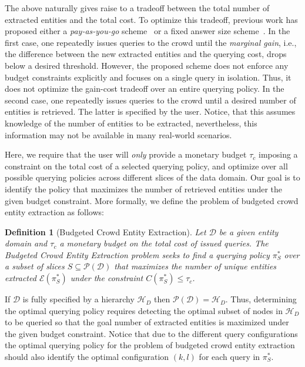 \documentclass{vldb}
\newtheorem{definition}{Definition}
\newcommand{\domain}{\mathcal{D}}
\newcommand{\hierarchy}{\mathcal{H}_D}
\newcommand{\uentities}{\mathcal{E}}
\begin{document}
The above naturally gives raise to a tradeoff between the total number of extracted entities and the total cost. To optimize this tradeoff, previous work has proposed either a {\em pay-as-you-go} scheme~\cite{trushkowsky:2013} or a fixed answer size scheme~\cite{park:2014}. In the first case, one repeatedly issues queries to the crowd until the {\em marginal gain}, i.e., the difference between the new extracted entities and the querying cost, drops below a desired threshold. However, the proposed scheme does not enforce any budget constraints explicitly and focuses on a single query in isolation. Thus, it does not optimize the gain-cost tradeoff over an entire querying policy. In the second case, one repeatedly issues queries to the crowd until a desired number of entities is retrieved. The latter is specified by the user. Notice, that this assumes knowledge of the number of entities to be extracted, nevertheless, this information may not be available in many real-world scenarios. 

Here, we require that the user will {\em only} provide a monetary budget $\tau_c$ imposing a constraint on the total cost of a selected querying policy, and optimize over all possible querying policies across different slices of the data domain. Our goal is to identify the policy that maximizes the number of retrieved entities under the given budget constraint. More formally, we define the problem of budgeted crowd entity extraction as follows:

\begin{definition}[Budgeted Crowd Entity Extraction]
Let $\domain$ be a given entity domain and $\tau_c$ a monetary budget on the total cost of issued queries. The Budgeted Crowd Entity Extraction problem seeks to find 
a querying policy $\pi^*_S$ over a subset of slices $S \subseteq \mathcal{P}(\domain)$ that maximizes the number of unique entities extracted $\uentities(\pi^*_S)$ under the constraint $C(\pi^*_S) \leq \tau_c$.
\end{definition}

If $\domain$ is fully specified by a hierarchy $\hierarchy$ then $\mathcal{P}(\domain) = \hierarchy$. Thus, determining the optimal querying policy requires detecting the optimal subset of nodes in $\hierarchy$ to be queried so that the goal number of extracted entities is maximized under the given budget constraint. Notice that due to the different query configurations the optimal querying policy for the problem of budgeted crowd entity extraction should also identify the optimal configuration $(k,l)$ for each query in $\pi^*_S$.
\end{document}

